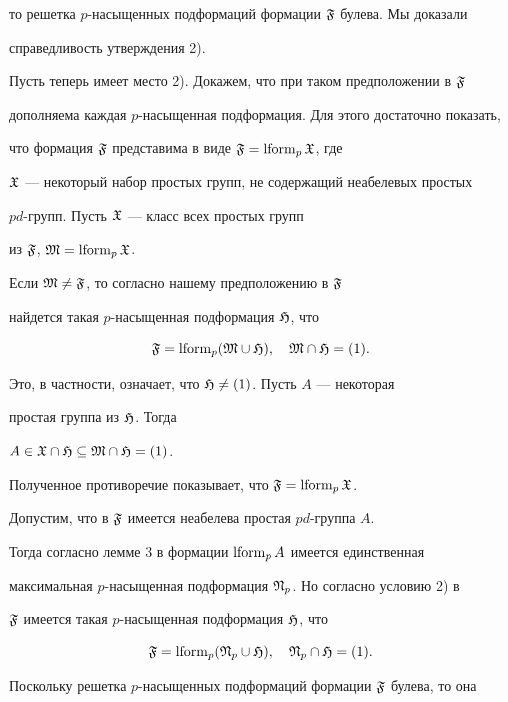 \begin{pf}
то решетка $p$-насыщенных подформаций формации $\frak F$ булева. Мы доказали 


справедливость утверждения 2). 


 


Пусть теперь имеет место 2). Докажем, что при таком предположении в $\frak F$ 


дополняема каждая $p$-насыщенная подформация. Для этого достаточно показать, 


что формация $\frak F$ представима в виде $\frak F=\operatorname{lform}_p\frak X$, где 


$\frak X$ --- некоторый набор простых групп, не содержащий неабелевых простых 


$pd$-групп. Пусть $\frak X$ --- класс всех простых групп 


из $\frak F$, $\frak M=\operatorname{lform}_p\frak X$. 


 


Если $\frak M\ne\frak F$, то согласно нашему предположению в $\frak F$ 


найдется такая $p$-насыщенная подформация $\frak H$, что 


$$ 


\frak F=\lform_p(\frak M\cup\frak H),\quad \frak M\cap\frak H=(1). 


$$ 


Это, в частности, означает, что $\frak H\ne(1)$. Пусть $A$ --- некоторая 


простая группа из $\frak H$. Тогда 


$A\in\frak X\cap\frak H\subseteq\frak M\cap\frak H=(1)$. 


Полученное противоречие показывает, что $\frak F=\operatorname{lform}_p\frak X$. 


 


Допустим, что в $\frak F$ имеется неабелева простая $pd$-группа $A$. 


Тогда согласно лемме 3 в формации $\operatorname{lform}_pA$ имеется единственная 


максимальная $p$-насыщенная подформация $\frak N_p$. Но согласно условию 2) в 


$\frak F$ имеется такая $p$-насыщенная подформация $\frak H$, что 


$$ 


\frak F=\lform_p(\frak N_p\cup\frak H),\quad \frak N_p\cap\frak H=(1). 


$$ 


Поскольку решетка $p$-насыщенных подформаций формации $\frak F$ булева, то она 



\end{pf}
